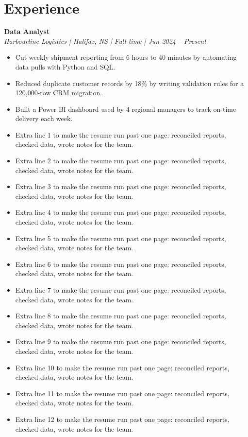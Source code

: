 \documentclass[11pt,letterpaper]{article}
\newcommand{\entry}[2]{\textbf{#1}\\\textit{#2}\par}
\begin{document}
\section{Experience}
\entry{Data Analyst}{Harbourline Logistics | Halifax, NS | Full-time | Jun 2024 -- Present}
\begin{itemize}
  \item Cut weekly shipment reporting from 6 hours to 40 minutes by automating data pulls with Python and SQL.
  \item Reduced duplicate customer records by 18\% by writing validation rules for a 120,000-row CRM migration.
  \item Built a Power BI dashboard used by 4 regional managers to track on-time delivery each week.
  \item Extra line 1 to make the resume run past one page: reconciled reports, checked data, wrote notes for the team.
  \item Extra line 2 to make the resume run past one page: reconciled reports, checked data, wrote notes for the team.
  \item Extra line 3 to make the resume run past one page: reconciled reports, checked data, wrote notes for the team.
  \item Extra line 4 to make the resume run past one page: reconciled reports, checked data, wrote notes for the team.
  \item Extra line 5 to make the resume run past one page: reconciled reports, checked data, wrote notes for the team.
  \item Extra line 6 to make the resume run past one page: reconciled reports, checked data, wrote notes for the team.
  \item Extra line 7 to make the resume run past one page: reconciled reports, checked data, wrote notes for the team.
  \item Extra line 8 to make the resume run past one page: reconciled reports, checked data, wrote notes for the team.
  \item Extra line 9 to make the resume run past one page: reconciled reports, checked data, wrote notes for the team.
  \item Extra line 10 to make the resume run past one page: reconciled reports, checked data, wrote notes for the team.
  \item Extra line 11 to make the resume run past one page: reconciled reports, checked data, wrote notes for the team.
  \item Extra line 12 to make the resume run past one page: reconciled reports, checked data, wrote notes for the team.

\end{itemize}
\end{document}
